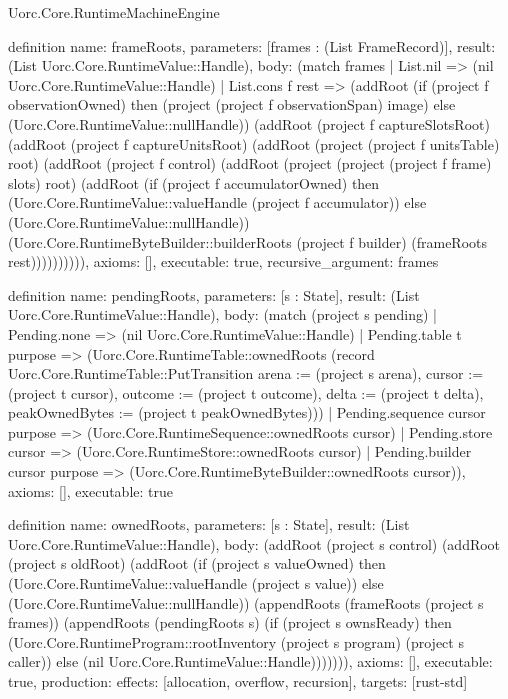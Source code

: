 \begin{lexlean}{Uorc.Core.RuntimeMachineEngine}
\begin{semanticmodule}
definition{
  name: frameRoots,
  parameters: [frames : (List FrameRecord)],
  result: (List Uorc.Core.RuntimeValue::Handle),
  body: (match frames
    | List.nil => (nil Uorc.Core.RuntimeValue::Handle)
    | List.cons f rest => (addRoot (if (project f observationOwned) then (project (project f observationSpan) image) else (Uorc.Core.RuntimeValue::nullHandle)) (addRoot (project f captureSlotsRoot) (addRoot (project f captureUnitsRoot) (addRoot (project (project f unitsTable) root) (addRoot (project f control) (addRoot (project (project (project f frame) slots) root) (addRoot (if (project f accumulatorOwned) then (Uorc.Core.RuntimeValue::valueHandle (project f accumulator)) else (Uorc.Core.RuntimeValue::nullHandle)) (Uorc.Core.RuntimeByteBuilder::builderRoots (project f builder) (frameRoots rest)))))))))),
  axioms: [],
  executable: true,
  recursive_argument: frames
}

definition{
  name: pendingRoots,
  parameters: [s : State],
  result: (List Uorc.Core.RuntimeValue::Handle),
  body: (match (project s pending)
    | Pending.none => (nil Uorc.Core.RuntimeValue::Handle)
    | Pending.table t purpose => (Uorc.Core.RuntimeTable::ownedRoots (record Uorc.Core.RuntimeTable::PutTransition {arena := (project s arena), cursor := (project t cursor), outcome := (project t outcome), delta := (project t delta), peakOwnedBytes := (project t peakOwnedBytes)}))
    | Pending.sequence cursor purpose => (Uorc.Core.RuntimeSequence::ownedRoots cursor)
    | Pending.store cursor => (Uorc.Core.RuntimeStore::ownedRoots cursor)
    | Pending.builder cursor purpose => (Uorc.Core.RuntimeByteBuilder::ownedRoots cursor)),
  axioms: [],
  executable: true
}

definition{
  name: ownedRoots,
  parameters: [s : State],
  result: (List Uorc.Core.RuntimeValue::Handle),
  body: (addRoot (project s control) (addRoot (project s oldRoot) (addRoot (if (project s valueOwned) then (Uorc.Core.RuntimeValue::valueHandle (project s value)) else (Uorc.Core.RuntimeValue::nullHandle)) (appendRoots (frameRoots (project s frames)) (appendRoots (pendingRoots s) (if (project s ownsReady) then (Uorc.Core.RuntimeProgram::rootInventory (project s program) (project s caller)) else (nil Uorc.Core.RuntimeValue::Handle))))))),
  axioms: [],
  executable: true,
  production: {effects: [allocation, overflow, recursion], targets: [rust-std]}
}


\end{semanticmodule}
\end{lexlean}
